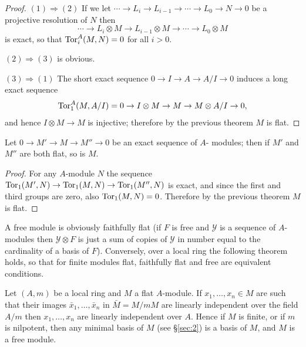 \begin{proof}
$(1) \Rightarrow (2)$ If we let $\cdots \to L_i \to L_{i-1} \to \cdots \to L_0 \to N \to 0$
be a projective resolution of $N$ then
\[
  \cdots \to L_i \otimes M \to L_{i-1} \otimes M \to \cdots \to L_0 \otimes M
\]
is exact, so that $\operatorname{Tor}^A_i(M, N) = 0$ for all $i > 0$.

$(2) \Rightarrow (3)$ is obvious.

$(3) \Rightarrow (1)$ The short exact sequence $0 \to I \to A \to A/I \to 0$ induces a
long exact sequence
\[
  \operatorname{Tor}^A_1(M, A/I) = 0 \to I \otimes M \to M \to M \otimes A/I \to 0,
\]
and hence $I \otimes M \to M$ is injective; therefore by the previous theorem $M$
is flat.
\end{proof}

\begin{theorem}\label{thm:7.9}
Let $0 \to M' \to M \to M'' \to 0$ be an exact sequence of $A$-
modules; then if $M'$ and $M''$ are both flat, so is $M$.
\end{theorem}

\begin{proof}
For any $A$-module $N$ the sequence $\operatorname{Tor}_1(M', N) \to \operatorname{Tor}_1(M, N)
\to \operatorname{Tor}_1(M'', N)$ is exact, and since the first and third groups are zero,
also $\operatorname{Tor}_1(M, N) = 0$. Therefore by the previous theorem $M$ is flat.
\end{proof}

A free module is obviously faithfully flat (if $F$ is free and $\mathcal{Y}$ is a sequence of
$A$-modules then $\mathcal{Y} \otimes F$ is just a sum of copies of $\mathcal{Y}$ in number equal to the
cardinality of a basis of $F$). Conversely, over a local ring the following
theorem holds, so that for finite modules flat, faithfully flat and free are
equivalent conditions.

\begin{theorem}\label{thm:7.10}
Let $(A, m)$ be a local ring and $M$ a flat $A$-module. If
$x_1, \ldots, x_n \in M$ are such that their images $\bar{x}_1, \ldots, \bar{x}_n$ in $\bar{M} = M/mM$ are
linearly independent over the field $A/m$ then $x_1, \ldots, x_n$ are linearly
independent over $A$. Hence if $M$ is finite, or if $m$ is nilpotent, then any
minimal basis of $M$ (see \S\ref{sec:2}) is a basis of $M$, and $M$ is a free module.
\end{theorem}

